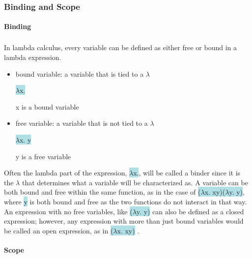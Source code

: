\documentclass{article}
\begin{document}
\subsubsection{Binding and Scope}

\paragraph{Binding}

\subparagraph{}

In lambda calculus, every variable can be defined as either free or bound in a lambda expression. 

\begin{itemize}

\item bound variable: a variable that is tied to a $\lambda$

 \colorbox{powderblue}{$\lambda$x.}

x is a bound variable

\item free variable: a variable that is not tied to a $\lambda$

 \colorbox{powderblue}{$\lambda$x. y}

y is a free variable

\end{itemize}

Often the lambda part of the expression, \colorbox{powderblue}{$\lambda$x.}, will be called a binder since it is the $\lambda$ that determines what a variable will be characterized as. A variable can be both bound and free within the same function, as in the case of \colorbox{powderblue}{($\lambda$x. xy)($\lambda$y. y)}, where \colorbox{powderblue}{y} is both bound and free as the two functions do not interact in that way. An expression with no free variables, like \colorbox{powderblue}{($\lambda$y. y)} can also be defined as a closed expression; however, any expression with more than just bound variables would be called an open expression, as in  \colorbox{powderblue}{($\lambda$x. xy)} \cite{LC}. 

\break

\paragraph{Scope}

\subparagraph{}
\end{document}
